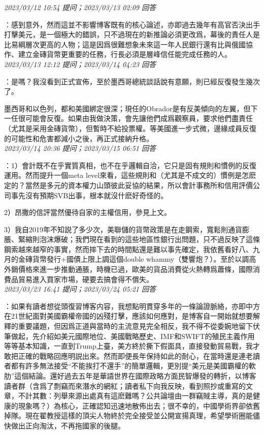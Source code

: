 \documentclass[twocolumn]{ctexart}
\begin{document}
\textit{\hfill\noindent\small 2023/03/12 10:54 提问；2023/03/13 02:09 回答}

：感到意外，然而這並不影響博客既有的核心論述，亦即過去幾年有高官否決出手打擊美元，是一個極大的錯誤，只不過現在的新推論必須更改爲，幕後的責任人是比易綱層次更高的人物；這是因爲很難想象未來這一年人民銀行還有比與俄國協作、建立金磚貨幣更重要的任務，行長必須是層峰信任能完成任務的人。
\\

\textit{\hfill\noindent\small 2023/03/13 12:12 提问；2023/03/14 04:23 回答}

：是嗎？我沒看到正式宣佈，至於墨西哥總統談話說有意願，則已經反復發生幾次了。

墨西哥和以色列，都和美國綁定很深；現任的Obrador是有反美傾向的左翼，但下一任很可能會反復。如果由我做決策，會先讓他們成爲觀察員，要求他們盡責任（尤其是采用金磚貨幣），但暫時不給投票權。等美國進一步式微，邊緣成員反復的可能性和危害都減小之後，再正式接納升格。
\\

\textit{\hfill\noindent\small 2023/03/14 20:36 提问；2023/03/15 06:51 回答}

：1）會計既不在乎實質真相，也不在乎邏輯自洽，它只是固有規則和慣例的反復運用。然而提升一個meta level來看，這些規則和（尤其是不成文的）慣例是怎麽定的？當然是多元的資本權力山頭彼此妥協的結果，所以會計事務所和信用評價公司事先沒有預期SVB出事，根本就沒什麽好奇怪的。

2）昂撒的信評當然優待自家的主權信用，參見上文。

3）我自2019年不知説了多少次，美聯儲的貨幣政策是在走鋼索，寬鬆則通貨膨脹、緊縮則泡沫爆破；我們現在看到的這些地區性銀行出問題，只不過反映了這條鋼索越來越窄的事實，然而摔下去的時間點還是難以事先確定，我依舊看好八、九月的金磚貨幣發行+國債上限上調這個double whammy（雙響炮？）。至於以調高外銷價格來進一步推動通脹，時機已過，歐美的貨品消費從火熱轉爲蕭條，國際消費品貿易進入買家市場，硬要去搞會得不償失。
\\

\textit{\hfill\noindent\small 2023/03/23 16:41 提问；2023/03/24 05:21 回答}

：如果有讀者想從頭復習博客内容，我想點明貫穿多年的一條論證脈絡，亦即中方在21世紀面對美國霸權帝國的凶殘打擊，應該如何應對，是博客自一開始就想要解釋的重要議題，但因爲正道與當時的主流意見完全相反，我不得不從委婉地留下伏筆做起，先介紹如美元國際地位、美國戰略歷史、IMF和SWIFT的殖民主義作用等等基本知識，一直到Trump上臺，美方終於撕下假面具，直接發動貿易戰，我才敢把正確的戰略回應明説出來。然而即便長年保持如此的耐心，在當時還是連老讀者都有許多無法接受“不能挨打不還手”的簡單邏輯，更別提“美元是美國霸權的軟肋”這個結論。還好過去五年是華語世界在國際政略方面民智爆發的轉折，以博客讀者群（含爲了剽竊而來潛水的網紅；讀者私下向我反映，看到照抄或重寫的文章，不計其數：列舉來源出處真有這麽難嗎？公共論壇由一群竊賊主導，真的是健康的現象嗎？）為核心，正確認知迅速地散佈出去；很不幸的，中國學術界卻依舊掉隊。現在翟教授這樣的頂尖人物終於完全接受並公開宣揚真理，希望學術圈能儘快做出正向淘汰，不再拖國家的後腿。
\end{document}

